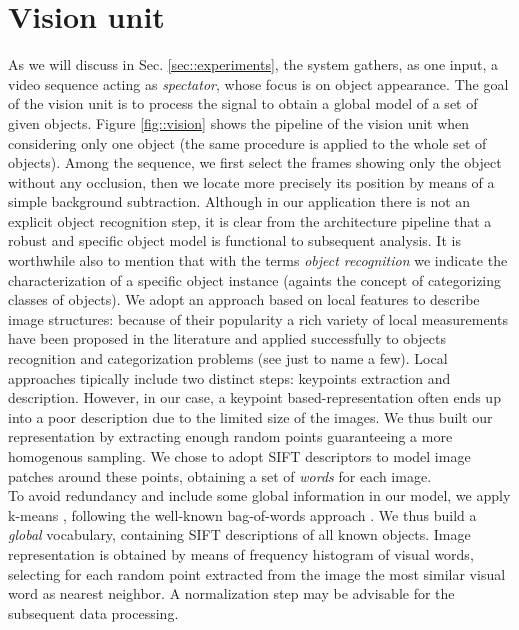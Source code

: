 \section{Vision unit}
\label{sec::vision}
As we will discuss in Sec. \ref{sec::experiments}, the system gathers, as one input, a video sequence acting as {\it spectator}, whose focus is on object appearance. The goal of the vision unit is to process the signal to obtain a global model of a set of given objects.
Figure \ref{fig::vision} shows the pipeline of the vision unit when considering only one object (the same procedure is applied to the whole set of objects). Among the sequence, we first select the frames showing only the object  without any occlusion, then we locate more precisely its position by means of a simple background subtraction. 
Although in our application there is not an explicit object recognition step, it is clear from the architecture pipeline that a robust and specific object model is functional to subsequent analysis. It is worthwhile also to mention that with the terms {\it object recognition} we indicate the characterization of a specific object instance (againts the concept of categorizing classes of objects).
We adopt an approach based on local features to describe image structures: because of their popularity a rich variety of local measurements have been proposed in the literature \cite{harris,schmid,lowe} and applied successfully to objects recognition and categorization problems (see \cite{csurka,ferrari} just to name a few). 
Local approaches tipically include two distinct steps: keypoints extraction and description. 
However, in our case, a keypoint based-representation often ends up into a poor description
due to the limited size of the images. We thus built our representation by extracting enough 
random points  guaranteeing a more homogenous sampling.
We chose to adopt SIFT descriptors \cite{lowe,schmid2} to model image patches around these points, obtaining a set of {\it words} for each image.\\
To avoid redundancy and include some global information in our model, we apply k-means \cite{wong}, following the well-known bag-of-words approach \cite{csurka}. 
We thus build a {\it global} vocabulary, containing SIFT descriptions of all known objects. 
Image representation is obtained by means of frequency histogram of visual words, selecting for each random point extracted from the image 
the most similar visual word as nearest neighbor. A normalization step may be advisable for the subsequent data processing.